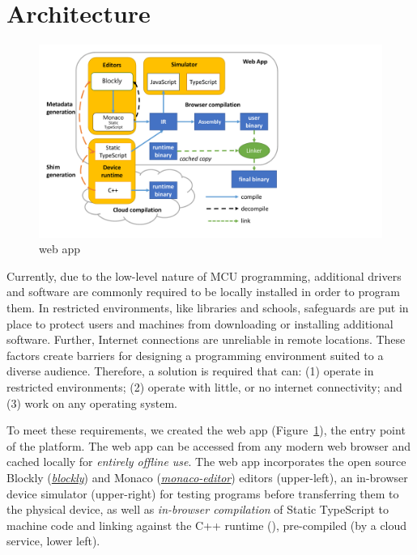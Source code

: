 \section{Architecture}

\begin{figure}[t]
    \includegraphics[width=4.8in]{makecodeFig.pdf}
\caption{\label{fig:makecode}\MC web app}
\end{figure}

Currently, due to the low-level nature of MCU programming, additional drivers and software are commonly required to be locally installed in order to program them. In restricted environments, like libraries and schools, safeguards are put in place to protect users and machines from downloading or installing additional software. Further, Internet connections are unreliable in remote locations. These factors create barriers for designing a programming environment suited to a diverse audience. Therefore, a solution is required that can: (1) operate in restricted environments; (2) operate with little, or no internet connectivity; and (3) work on any operating system.

To meet these requirements, we created the \MC web app (Figure~\ref{fig:makecode}), the entry point of the platform. The web app can be accessed from any modern web browser and cached locally for \emph{entirely offline use}. The \MC web app incorporates the open source Blockly (\emph{\href{https://github.com/google/blockly}{blockly}}) and Monaco (\emph{\href{https://github.com/Microsoft/monaco-editor}{monaco-editor}}) editors (upper-left), an in-browser device simulator (upper-right) for testing programs before transferring them to the physical device, as well as \emph{in-browser compilation} of Static TypeScript to machine code and linking against the C++ runtime (\emph{\CON}), pre-compiled (by a cloud service, lower left).

